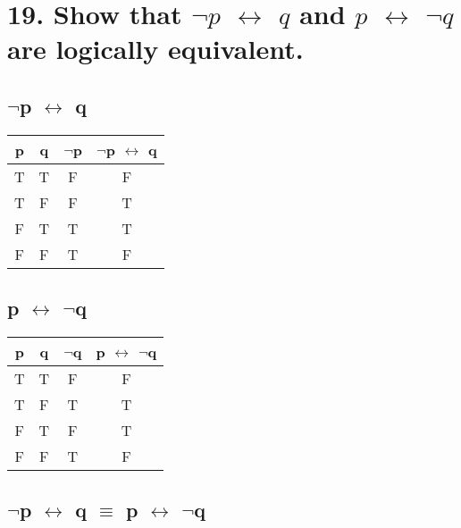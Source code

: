\documentclass[11pt, oneside]{article} %
\numberwithin{equation}{section} %
\numberwithin{figure}{section} %
\numberwithin{table}{section} %
\begin{document}
\begin{table}[!htp]
\section{19. Show that $\neg$$p$ $\leftrightarrow$ $q$ and $p$ $\leftrightarrow$ $\neg$$q$ are logically equivalent.}
\subsection{$\neg$p $\leftrightarrow$ q}
\begin{tabular}{c c c c}
\hline\hline
p & q & $\neg$p & $\neg$p $\leftrightarrow$ q \\ [0.5ex] %
\hline
T & T & F & F\\
T & F & F & T\\
F & T & T & T\\
F & F & T & F\\ [1ex]
\hline
\end{tabular}
\label{table:nonlin}
\end{table}

\begin{table}[!htp]
\subsection{p $\leftrightarrow$ $\neg$q}
\begin{tabular}{c c c c}
\hline\hline
p & q & $\neg$q & p $\leftrightarrow$ $\neg$q \\ [0.5ex] %
\hline
T & T & F & F\\
T & F & T & T\\
F & T & F & T\\
F & F & T & F\\ [1ex]
\hline
\end{tabular}
\label{table:nonlin}
\subsection{$\neg$p $\leftrightarrow$ q $\equiv$ p $\leftrightarrow$ $\neg$q}
\end{table}
\end{document}
